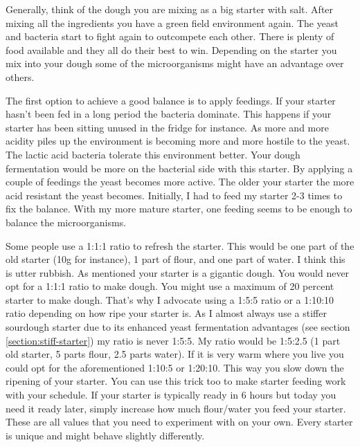 Generally, think of the dough you are mixing as a big starter with salt.
After mixing all the ingredients you have a green field environment again.
The yeast and bacteria start to fight again to outcompete each other.
There is plenty of food available and they all do their best to win.
Depending on the starter you mix into your dough some of the microorganisms
might have an advantage over others.

The first option to achieve a good balance is to apply feedings.
If your starter hasn't been fed in a long period the
bacteria dominate. This happens if your starter has been
sitting unused in the fridge for instance. As more and more
acidity piles up the environment is becoming more and more hostile
to the yeast. The lactic acid bacteria tolerate this environment
better. Your dough fermentation would be more on the
bacterial side with this starter. By applying a couple of
feedings the yeast becomes more active. The older your
starter the more acid resistant the yeast becomes. Initially,
I had to feed my starter 2-3 times to fix the balance. With my
more mature starter, one feeding seems to be enough to balance
the microorganisms.

Some people use a 1:1:1 ratio to refresh the starter. This would
be one part of the old starter (10g for instance), 1 part of flour,
and one part of water. I think this is utter rubbish. As mentioned
your starter is a gigantic dough. You would never opt for a 1:1:1 ratio to
make dough. You might use a maximum of 20 percent starter to
make dough. That's why I advocate using a 1:5:5 ratio or a
1:10:10 ratio depending on how ripe your starter is. As I almost
always use a stiffer sourdough starter due to its enhanced
yeast fermentation advantages (see section \ref{section:stiff-starter})
my ratio is never 1:5:5. My ratio would be 1:5:2.5 (1 part old starter,
5 parts flour, 2.5 parts water). If it is very warm where you live
you could opt for the aforementioned 1:10:5 or 1:20:10. This
way you slow down the ripening of your starter. You can use this
trick too to make starter feeding work with your schedule.
If your starter is typically ready in 6 hours but today you need it
ready later, simply increase how much flour/water you feed your starter.
These are all values that you need to experiment with on your own.
Every starter is unique and might behave slightly differently.

